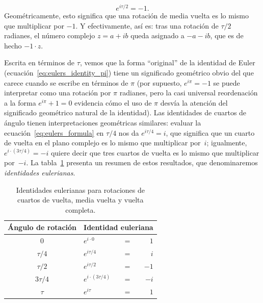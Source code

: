 \[
e^{i\tau/2} = -1.
\]
Geométricamente, esto significa que una rotación de media vuelta es lo mismo que multiplicar por $-1$. Y efectivamente, así es: tras una rotación de $\tau/2$ radianes, el número complejo $z = a + ib$ queda asignado a $-a - ib$, que es de hecho $-1\cdot z$.

Escrita en términos de $\tau$, vemos que la forma ``original'' de la identidad de Euler (ecuación~\eqref{eq:eulers_identity_pi}) tiene un significado geométrico obvio del que carece cuando se escribe en términos de $\pi$ (por supuesto, $e^{i\pi} = -1$ se puede interpretar como una rotación por $\pi$ radianes, pero la casi universal reordenación a la forma $e^{i\pi} + 1 = 0$ evidencia cómo el uso de $\pi$ desvía la atención del significado geométrico natural de la identidad). Las identidades de cuartos de ángulo tienen interpretaciones geométricas similares: evaluar la ecuación~\eqref{eq:eulers_formula} en $\tau/4$ nos da $e^{i\tau/4} = i$, que significa que un cuarto de vuelta en el plano complejo es lo mismo que multiplicar por~$i$; igualmente, $e^{i\cdot(3\tau/4)} = -i$ quiere decir que tres cuartos de vuelta es lo mismo que multiplicar por~$-i$. La tabla~\ref{table:eulerian_identities} presenta un resumen de estos resultados, que denominaremos \emph{identidades eulerianas}.


\begin{table}
\begin{center}
\begin{tabular}{cllr}
Ángulo de rotación & \multicolumn{3}{c}{Identidad euleriana} \\ \hline
$0$ & $e^{i\cdot0}$ & $ = $ & $1$ \smallskip \\
$\tau/4$ & $e^{i\tau/4}$ & $ = $ & $i$ \smallskip \\
$\tau/2$ & $e^{i\tau/2}$ & $ = $ & $-1$ \smallskip \\
$3\tau/4$ & $e^{i\cdot(3\tau/4)}$ & $ = $ & $-i$ \smallskip \\
$\tau$ & $e^{i\tau}$ & $ = $ & $1$
\end{tabular}
\end{center}
\caption{Identidades eulerianas para rotaciones de cuartos de vuelta, media vuelta y vuelta completa.\label{table:eulerian_identities}}
\end{table}

